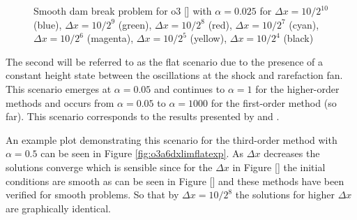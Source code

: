 \documentclass[SingleSpace,12pt,Proceedings]{Serre_ASCE}
\begin{document}
\begin{figure}
\centering
{}
\caption{Smooth dam break problem for o3 [] with $\alpha = 0.025$ for $\Delta x = 10/2^{10}$ (blue), $\Delta x = 10/2^9$ (green), $\Delta x = 10/2^8$ (red), $\Delta x = 10/2^7$ (cyan), $\Delta x = 10/2^6$ (magenta), $\Delta x = 10/2^5$ (yellow), $\Delta x = 10/2^4$ (black)}
\label{fig:o3a1dxlimflatexp}
\end{figure}

The second will be referred to as the flat scenario due to the presence of a constant height state between the oscillations at the shock and rarefaction fan. This scenario emerges at $\alpha = 0.05 $ and continues to $\alpha = 1$ for the higher-order methods and occurs from $\alpha = 0.05 $ to $\alpha = 1000 $ for the first-order method (so far). This scenario corresponds to the results presented by  and . 

An example plot demonstrating this scenario for the third-order method with $\alpha = 0.5$ can be seen in Figure \ref{fig:o3a6dxlimflatexp}. As $\Delta x$ decreases the solutions converge which is sensible since for the $\Delta x$ in Figure [] the initial conditions are smooth as can be seen in Figure [] and these methods have been verified for smooth problems. So that by $\Delta x = 10 / 2^8$ the solutions for higher $\Delta x$ are graphically identical. 
\end{document}
